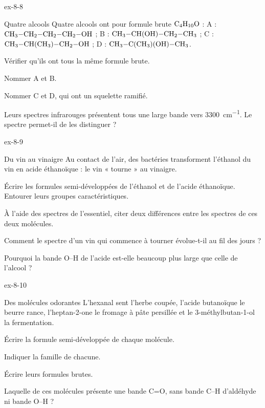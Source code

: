 \begin{blocLivre}{ex-8-8}
\begin{exercice}[2]{Quatre alcools}
Quatre alcools ont pour formule brute $\ce{C4H10O}$ :
A : $\ce{CH3-CH2-CH2-CH2-OH}$ ; B : $\ce{CH3-CH(OH)-CH2-CH3}$ ; C : $\ce{CH3-CH(CH3)-CH2-OH}$ ; D : $\ce{CH3-C(CH3)(OH)-CH3}$.
\begin{questions}
\item Vérifier qu'ils ont tous la même formule brute.
\item Nommer A et B.
\item Nommer C et D, qui ont un squelette ramifié.
\item Leurs spectres infrarouges présentent tous une large bande vers \qty{3300}{cm^{-1}}. Le spectre permet-il de les distinguer ?
\end{questions}
\end{exercice}
\end{blocLivre}
\begin{blocLivre}{ex-8-9}
\begin{exercice}[2]{Du vin au vinaigre}
Au contact de l'air, des bactéries transforment l'éthanol du vin en acide éthanoïque : le vin « tourne » au vinaigre.
\begin{questions}
\item Écrire les formules semi-développées de l'éthanol et de l'acide éthanoïque. Entourer leurs groupes caractéristiques.
\item À l'aide des spectres de l'essentiel, citer deux différences entre les spectres de ces deux molécules.
\item Comment le spectre d'un vin qui commence à tourner évolue-t-il au fil des jours ?
\item Pourquoi la bande O--H de l'acide est-elle beaucoup plus large que celle de l'alcool ?
\end{questions}
\end{exercice}
\end{blocLivre}
\begin{blocLivre}{ex-8-10}
\begin{exercice}[2]{Des molécules odorantes}
L'hexanal sent l'herbe coupée, l'acide butanoïque le beurre rance, l'heptan-2-one le fromage à pâte persillée et le
3-méthylbutan-1-ol la fermentation.
\begin{questions}
\item Écrire la formule semi-développée de chaque molécule.
\item Indiquer la famille de chacune.
\item Écrire leurs formules brutes.
\item Laquelle de ces molécules présente une bande C=O, sans bande C--H d'aldéhyde ni bande O--H ?
\end{questions}
\end{exercice}
\end{blocLivre}
